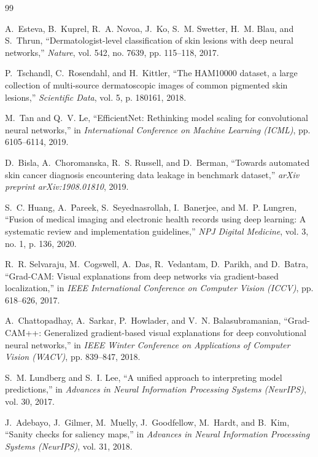 \documentclass[12pt,a4paper]{report}
\begin{document}
\cleardoublepage
{}
{}
\begin{thebibliography}{99}
	
	A.~Esteva, B.~Kuprel, R.~A. Novoa, J.~Ko, S.~M. Swetter, H.~M. Blau, and S.~Thrun,
	``Dermatologist-level classification of skin lesions with deep neural networks,''
	\emph{Nature}, vol. 542, no. 7639, pp. 115--118, 2017.
	
	P.~Tschandl, C.~Rosendahl, and H.~Kittler,
	``The HAM10000 dataset, a large collection of multi-source dermatoscopic images of common pigmented skin lesions,''
	\emph{Scientific Data}, vol. 5, p. 180161, 2018.
	
	M.~Tan and Q.~V. Le,
	``EfficientNet: Rethinking model scaling for convolutional neural networks,''
	in \emph{International Conference on Machine Learning (ICML)}, pp. 6105--6114, 2019.
	
	D.~Bisla, A.~Choromanska, R.~S. Russell, and D.~Berman,
	``Towards automated skin cancer diagnosis encountering data leakage in benchmark dataset,''
	\emph{arXiv preprint arXiv:1908.01810}, 2019.
	
	S.~C. Huang, A.~Pareek, S.~Seyednasrollah, I.~Banerjee, and M.~P. Lungren,
	``Fusion of medical imaging and electronic health records using deep learning: A systematic review and implementation guidelines,''
	\emph{NPJ Digital Medicine}, vol. 3, no. 1, p. 136, 2020.
	
	R.~R. Selvaraju, M.~Cogswell, A.~Das, R.~Vedantam, D.~Parikh, and D.~Batra,
	``Grad-CAM: Visual explanations from deep networks via gradient-based localization,''
	in \emph{IEEE International Conference on Computer Vision (ICCV)}, pp. 618--626, 2017.
	
	A.~Chattopadhay, A.~Sarkar, P.~Howlader, and V.~N. Balasubramanian,
	``Grad-CAM++: Generalized gradient-based visual explanations for deep convolutional neural networks,''
	in \emph{IEEE Winter Conference on Applications of Computer Vision (WACV)}, pp. 839--847, 2018.
	
	S.~M. Lundberg and S.~I. Lee,
	``A unified approach to interpreting model predictions,''
	in \emph{Advances in Neural Information Processing Systems (NeurIPS)}, vol. 30, 2017.
	
	J.~Adebayo, J.~Gilmer, M.~Muelly, J.~Goodfellow, M.~Hardt, and B.~Kim,
	``Sanity checks for saliency maps,''
	in \emph{Advances in Neural Information Processing Systems (NeurIPS)}, vol. 31, 2018.
	

\end{thebibliography}
\end{document}
